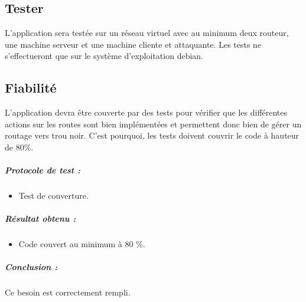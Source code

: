 \subsection{Tester}
L'application sera testée sur un réseau virtuel avec au minimum deux routeur, une machine serveur et une machine cliente et attaquante. Les tests ne s'effectueront que sur le système d'exploitation debian.

\subsection{Fiabilité}
L'application devra être couverte par des tests pour vérifier que les différentes actions sur les routes sont bien implémentées et permettent donc bien de gérer un routage vers trou noir. C'est pourquoi, les tests doivent couvrir le code à hauteur de 80\%.

\subparagraph{Protocole de test :}
\begin{itemize}
    \item Test de couverture.
\end{itemize}
\subparagraph{Résultat obtenu :}
    \begin{itemize}
    \item Code couvert au minimum à 80 \%.
\end{itemize}
\subparagraph{Conclusion :}Ce besoin est correctement rempli.



